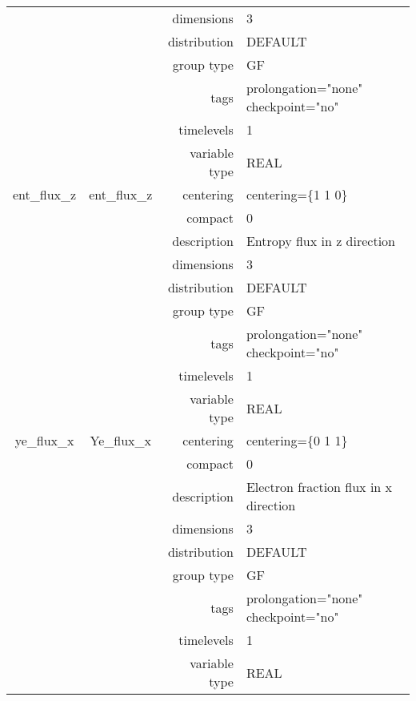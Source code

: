 \documentclass{article}
\begin{document}
\begin{tabular*}{150mm}{|c|c@{\extracolsep{\fill}}|rl|}
 &  & dimensions & 3 \\ 
 &  & distribution & DEFAULT \\ 
 &  & group type & GF \\ 
 &  & tags & prolongation="none" checkpoint="no" \\ 
 &  & timelevels & 1 \\ 
 &  & variable type & REAL \\ 
\hline 
ent\_flux\_z & ent\_flux\_z & centering & centering=\{1 1 0\} \\ 
 &  & compact & 0 \\ 
 &  & description & Entropy flux in z direction \\ 
 &  & dimensions & 3 \\ 
 &  & distribution & DEFAULT \\ 
 &  & group type & GF \\ 
 &  & tags & prolongation="none" checkpoint="no" \\ 
 &  & timelevels & 1 \\ 
 &  & variable type & REAL \\ 
\hline 
ye\_flux\_x & Ye\_flux\_x & centering & centering=\{0 1 1\} \\ 
 &  & compact & 0 \\ 
 &  & description & Electron fraction flux in x direction \\ 
 &  & dimensions & 3 \\ 
 &  & distribution & DEFAULT \\ 
 &  & group type & GF \\ 
 &  & tags & prolongation="none" checkpoint="no" \\ 
 &  & timelevels & 1 \\ 
 &  & variable type & REAL \\ 
\hline 
\end{tabular*} 



\vspace{5mm}
\vspace{5mm}
\end{document}
